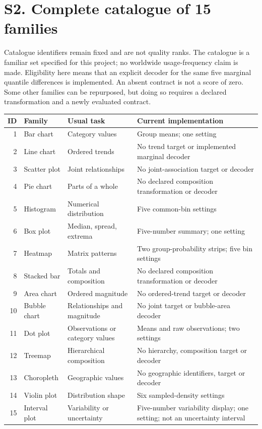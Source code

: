 \documentclass[10pt]{article}
\begin{document}
\section*{S2. Complete catalogue of 15 families}
Catalogue identifiers remain fixed and are not quality ranks. The catalogue is a familiar set specified for this project; no worldwide usage-frequency claim is made. Eligibility here means that an explicit decoder for the same five marginal quantile differences is implemented. An absent contract is not a score of zero. Some other families can be repurposed, but doing so requires a declared transformation and a newly evaluated contract.
\begin{longtable}{rp{2.7cm}p{4.3cm}p{6.7cm}}\toprule
ID & Family & Usual task & Current implementation\\\midrule\endhead
1 & Bar chart & Category values & Group means; one setting\\
2 & Line chart & Ordered trends & No trend target or implemented marginal decoder\\
3 & Scatter plot & Joint relationships & No joint-association target or decoder\\
4 & Pie chart & Parts of a whole & No declared composition transformation or decoder\\
5 & Histogram & Numerical distribution & Five common-bin settings\\
6 & Box plot & Median, spread, extrema & Five-number summary; one setting\\
7 & Heatmap & Matrix patterns & Two group-probability strips; five bin settings\\
8 & Stacked bar & Totals and composition & No declared composition transformation or decoder\\
9 & Area chart & Ordered magnitude & No ordered-trend target or decoder\\
10 & Bubble chart & Relationships and magnitude & No joint target or bubble-area decoder\\
11 & Dot plot & Observations or category values & Means and raw observations; two settings\\
12 & Treemap & Hierarchical composition & No hierarchy, composition target or decoder\\
13 & Choropleth & Geographic values & No geographic identifiers, target or decoder\\
14 & Violin plot & Distribution shape & Six sampled-density settings\\
15 & Interval plot & Variability or uncertainty & Five-number variability display; one setting; not an uncertainty interval\\\bottomrule
\end{longtable}
\end{document}
